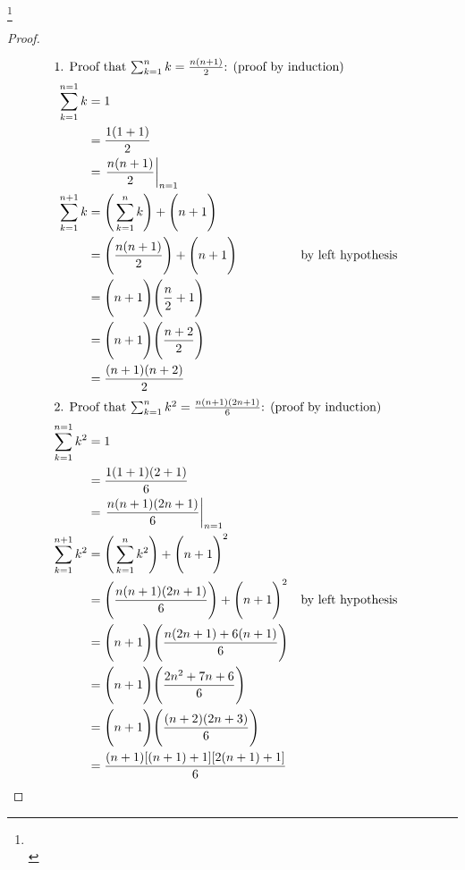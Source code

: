 \begin{proposition}
\footnote{
  \\
  }
\end{proposition}
\begin{proof}
\begin{align*}
\intertext{1. Proof that $\sum_{k=1}^n k=\frac{n(n+1)}{2}$: (proof by induction)}
  \sum_{k=1}^{n=1} k
    &= 1
  \\&= \frac{1(1+1)}{2}
  \\&= \left.\frac{n(n+1)}{2}\right|_{n=1} 
  \\
  \sum_{k=1}^{n+1} k
    &= \Bigg(\sum_{k=1}^n k\Bigg) + \Bigg(n+1\Bigg)
  \\&= \Bigg(\frac{n(n+1)}{2}\Bigg) + \Bigg(n+1\Bigg)
    && \text{by left hypothesis}
  \\&= \Bigg(n+1\Bigg)\Bigg(\frac{n}{2}+1\Bigg)  
  \\&= \Bigg(n+1\Bigg)\Bigg(\frac{n+2}{2}\Bigg)  
  \\&= \frac{(n+1)(n+2)}{2} 
  \\
\intertext{2. Proof that $\sum_{k=1}^n k^2 = \frac{n(n+1)(2n+1)}{6}$: (proof by induction)}
  \sum_{k=1}^{n=1} k^2 
    &= 1
  \\&= \frac{1(1+1)(2+1)}{6}
  \\&= \left.\frac{n(n+1)(2n+1)}{6}\right|_{n=1} 
  \\
  \sum_{k=1}^{n+1} k^2
    &= \Bigg(\sum_{k=1}^n k^2\Bigg) + \Bigg(n+1\Bigg)^2
  \\&= \Bigg(\frac{n(n+1)(2n+1)}{6}\Bigg) + \Bigg(n+1\Bigg)^2
    && \text{by left hypothesis}
  \\&= \Bigg(n+1\Bigg)\Bigg(\frac{n(2n+1)+6(n+1)}{6}\Bigg) 
  \\&= \Bigg(n+1\Bigg)\Bigg(\frac{2n^2+7n+6}{6}\Bigg) 
  \\&= \Bigg(n+1\Bigg)\Bigg(\frac{(n+2)(2n+3)}{6}\Bigg) 
  \\&= \frac{(n+1)[(n+1)+1][2(n+1)+1]}{6} 
\end{align*}
\end{proof}


\fi